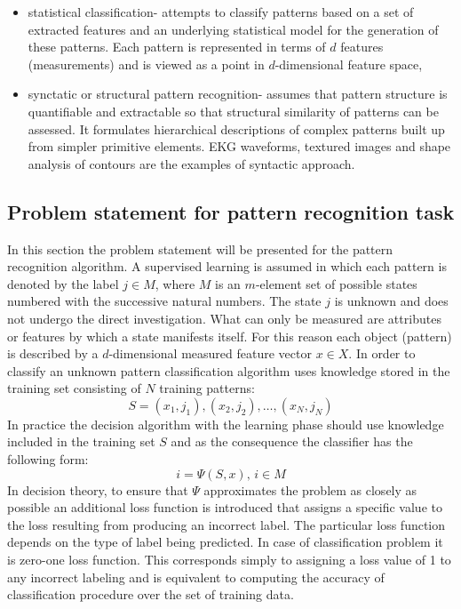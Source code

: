 \begin{itemize}
    \item statistical classification- attempts to classify patterns
        based on a set of extracted features and an underlying 
        statistical model for the generation of these patterns. 
        Each pattern is represented in terms of $d$ features (measurements) 
        and is viewed as a point in $d$-dimensional feature space,
    \item synctatic or structural pattern recognition- assumes that pattern
        structure is quantiﬁable and extractable so that structural
        similarity of patterns can be assessed. It formulates hierarchical
        descriptions of complex patterns built up from simpler
        primitive elements. EKG waveforms, textured images and shape analysis 
        of contours are the examples of syntactic approach.
\end{itemize}

\subsection{Problem statement for pattern recognition task}
\label{cha:Problem_statement}
In this section the problem statement will be presented for the pattern
recognition algorithm. A supervised learning is assumed in which
each pattern is denoted by the label $j \in M$, where $M$ is an $m$-element set of
possible states numbered with the successive natural numbers. The state $j$ is
unknown and does not undergo the direct investigation. What can only be
measured are attributes or features by which a state manifests itself. For this
reason each object (pattern) is described by a $d$-dimensional measured feature vector $x \in
X$. In order to classify an unknown pattern classification algorithm uses knowledge stored in the training
set consisting of $N$ training patterns:
\begin{equation}
    S = (x_1, j_1), (x_2, j_2), \ldots, (x_N, j_N)
    \label{eq:training_pattern}
\end{equation}
In practice the decision algorithm with the learning phase should use knowledge included in the
training set $S$ and as the consequence the classifier has the following form:
\begin{equation}
    i=\Psi(S, x), \, i \in M
    \label{eq:decision_algorithm}
\end{equation}
In decision theory, to ensure that $\Psi$ approximates the problem as closely
as possible an additional loss function is introduced that assigns a specific
value to the loss resulting from producing an incorrect label. The particular loss
function depends on the type of label being predicted. In case of
classification problem it is zero-one loss function. This corresponds simply to
assigning a loss value of 1 to any incorrect labeling and is equivalent to computing
the accuracy of classification procedure over the set of training data.

